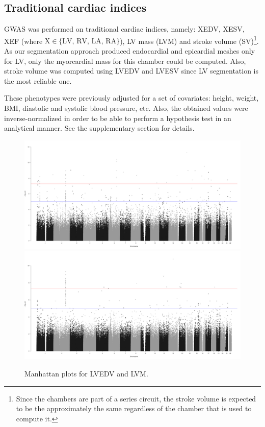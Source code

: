 \documentclass[twocolumn]{llncs}
\begin{document}
\subsection{Traditional cardiac indices}
GWAS was performed on traditional cardiac indices, namely: XEDV, XESV, XEF (where $\textrm{X}\in\{\textrm{LV},
\, \textrm{RV},\,\textrm{LA},\,\textrm{RA}\}$), LV mass (LVM) and stroke volume (SV)\footnote{Since the chambers are part of a series circuit, the stroke volume is expected to be the approximately the same regardless of the chamber that is used to compute it.}. As our segmentation approach produced endocardial and epicardial meshes only for LV, only the myorcardial mass for this chamber could be computed. Also, stroke volume was computed using LVEDV and LVESV since LV segmentation is the most reliable one.

These phenotypes were previously adjusted for a set of covariates: height, weight, BMI, diastolic and systolic blood pressure, etc. Also, the obtained values were inverse-normalized in order to be able to perform a hypothesis test in an analytical manner. See the supplementary section for details.

\begin{figure}
\includegraphics[width=0.8\linewidth]{figs/gwas/manhattan_LVEDV_automatic_adj.png}
\includegraphics[width=0.8\linewidth]{figs/gwas/manhattan_LVM_automatic_adj.png}
\caption{Manhattan plots for LVEDV and LVM.}
\end{figure}
\end{document}
